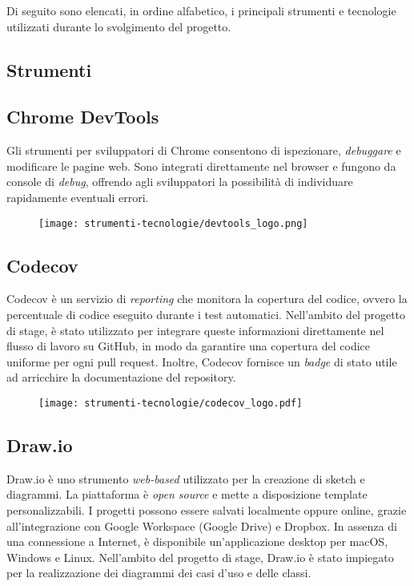 \par Di seguito sono elencati, in ordine alfabetico, i principali strumenti e tecnologie utilizzati durante lo svolgimento del progetto.

\subsection{Strumenti}

\subsection*{Chrome DevTools}

\par Gli strumenti per sviluppatori di Chrome consentono di ispezionare, \textit{debuggare} e modificare le pagine web. Sono integrati direttamente nel browser e fungono da console di \textit{debug}, offrendo agli sviluppatori la possibilità di individuare rapidamente eventuali errori.

\begin{figure}[H]
    \centering 
    \texttt{[image: strumenti-tecnologie/devtools\_logo.png]} 
\end{figure}

\subsection*{Codecov}

\par Codecov è un servizio di \textit{reporting} che monitora la copertura del codice, ovvero la percentuale di codice eseguito durante i test automatici. Nell’ambito del progetto di stage, è stato utilizzato per integrare queste informazioni direttamente nel flusso di lavoro su GitHub, in modo da garantire una copertura del codice uniforme per ogni \gls{pull request}. Inoltre, Codecov fornisce un \textit{badge} di stato utile ad arricchire la documentazione del \gls{repository}.

\begin{figure}[H]
    \centering 
    \texttt{[image: strumenti-tecnologie/codecov\_logo.pdf]} 
\end{figure}

\subsection*{Draw.io}

\par Draw.io è uno strumento \textit{web-based} utilizzato per la creazione di sketch e diagrammi. La piattaforma è \textit{open source} e mette a disposizione template personalizzabili. I progetti possono essere salvati localmente oppure online, grazie all’integrazione con Google Workspace (Google Drive) e Dropbox. In assenza di una connessione a Internet, è disponibile un'applicazione desktop per macOS, Windows e Linux. Nell’ambito del progetto di stage, Draw.io è stato impiegato per la realizzazione dei diagrammi dei casi d’uso e delle classi.

